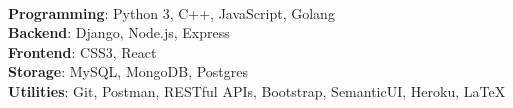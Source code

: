 \\
\textbf{Programming}: Python 3, C++, JavaScript, Golang \\
\vspace{1mm}
\textbf{Backend}: Django, Node.js, Express\\
\vspace{1mm}
\textbf{Frontend}: CSS3, React\\
\vspace{1mm}
\textbf{Storage}:  MySQL, MongoDB, Postgres\\
\vspace{1mm}
\textbf{Utilities}:  Git, Postman, RESTful APIs, Bootstrap, SemanticUI, Heroku, {\LaTeX}

